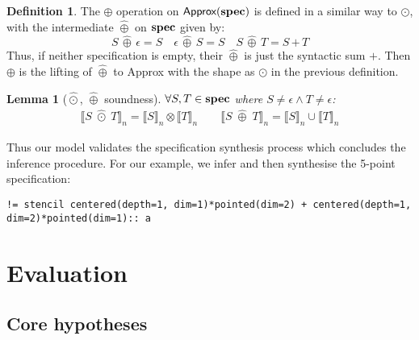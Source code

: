\documentclass[10pt,preprint]{sigplanconf}
\newcounter{block}
\newtheorem{lemma}[block]{Lemma}
\theoremstyle{definition}
\newtheorem{definition}[block]{Definition}
\newcommand{\interp}[1]{\llbracket{#1}\rrbracket}
\newcommand{\term}[1]{\texttt{#1}}
\begin{document}
\begin{definition}The $\oplus$ operation on $\textsf{Approx}(\textbf{spec})$
is defined in a similar way to $\odot$, with the intermediate $\hat{\oplus}$ on
$\textbf{spec}$ given by:
\begin{equation*}
S \,\hat{\oplus}\, \epsilon = S \quad
\epsilon \,\hat{\oplus}\, S = S \quad
S \, \hat{\oplus} \, T = S \, \term{+} \, T
\end{equation*}
Thus, if neither specification is empty, their $\hat{\oplus}$ is just
the syntactic sum $\term{+}$. Then $\oplus$ is the lifting of
$\hat{\oplus}$ to \textsf{Approx} with the shape as $\odot$ in the previous
definition.
\end{definition}

\begin{lemma}[$\hat{\odot}$, $\hat{\oplus}$ soundness]$\forall S,
  T \in \textbf{spec}$ where $S\!\neq \epsilon \wedge T\!\neq \epsilon$:
\begin{align*}
\interp{S \; \hat{\odot} \; T}_n = \interp{S}_n \otimes \interp{T}_n
  \qquad
\interp{S \; \hat{\oplus} \; T}_n = \interp{S}_n \cup \interp{T}_n
\end{align*}
\label{lem:alg-soundness}
\vspace{-2em}
\end{lemma}
%
\noindent
Thus our model validates the specification synthesis process which concludes the
inference procedure. For our example, we infer and then synthesise the
5-point specification:
\begin{verbatim}
!= stencil centered(depth=1, dim=1)*pointed(dim=2) + centered(depth=1, dim=2)*pointed(dim=1):: a
\end{verbatim}

\section{Evaluation}




\subsection{Core hypotheses}
\end{document}
